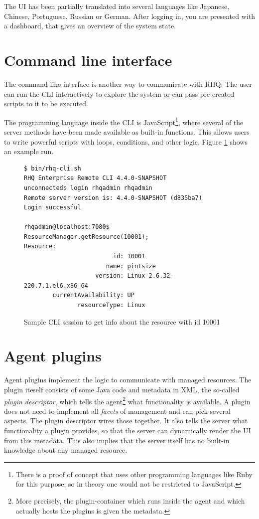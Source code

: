 \documentclass[twocolumn,10pt,a4paper]{article}
\begin{document}
The UI
has been partially translated into several languages like Japanese, Chinese, Portuguese, Russian or German. After logging in, you are presented with a dashboard, that gives an overview of the system state.

\section{Command line interface}

The command line interface is another way to communicate with RHQ. The user can run the CLI interactively to explore the system or can pass pre-created scripts to it to be executed.

The programming language inside the CLI is JavaScript\footnote{There is 
a proof of concept that uses other programming languages like Ruby for this 
purpose, so in theory one would not be restricted to JavaScript.}, where 
several of the server methods have been made available as built-in functions. 
This allows users to write powerful scripts with loops, conditions, and other logic. Figure \ref{cli-figure} shows an example run.

\begin{figure}[h]
{\scriptsize
\begin{verbatim}
$ bin/rhq-cli.sh
RHQ Enterprise Remote CLI 4.4.0-SNAPSHOT
unconnected$ login rhqadmin rhqadmin
Remote server version is: 4.4.0-SNAPSHOT (d835ba7)
Login successful

rhqadmin@localhost:7080$ ResourceManager.getResource(10001);             
Resource:
                         id: 10001
                       name: pintsize
                    version: Linux 2.6.32-220.7.1.el6.x86_64
        currentAvailability: UP
               resourceType: Linux
\end{verbatim}
}
\label{cli-figure}
\caption{Sample CLI session to get info about the resource with id 10001}
\end{figure}

\section{Agent plugins}

Agent plugins implement the logic to communicate with managed resources.
The plugin iteself consists of some Java code and metadata in XML, the 
so-called \emph{plugin descriptor}, which tells the agent\footnote{More precisely, 
the plugin-container which runs inside the agent and which actually 
hosts the plugins is given the metadata.} what functionality is 
available. A plugin does not need to implement all \emph{facets} of 
management and can pick several aspects. The plugin descriptor 
wires those together. It also tells the server what functionality 
a plugin provides, so that the server can dynamically render the 
UI from this metadata. This also implies that the server itself 
has no built-in knowledge about any managed resource.
\end{document}
